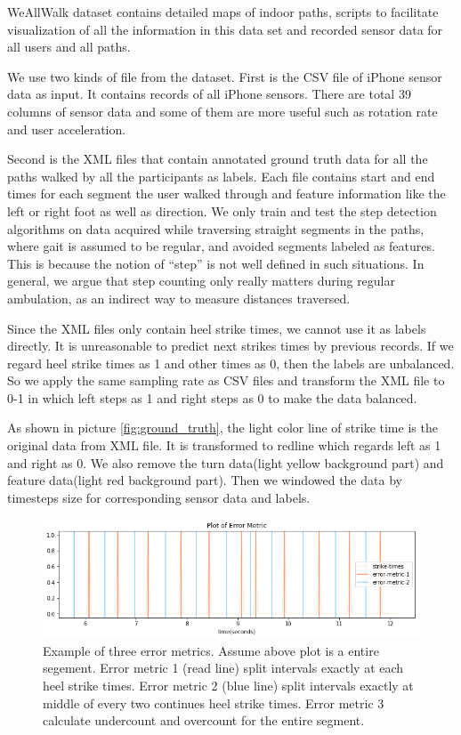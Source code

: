 \documentclass[11pt]{article}
\begin{document}
{WeAllWalk dataset contains detailed maps of indoor paths, scripts to facilitate visualization of all the information in this data set and recorded sensor data for all users and all paths.

We use two kinds of file from the dataset. First is the CSV file of iPhone sensor data as input. It contains records of all iPhone sensors. There are total 39 columns of sensor data and some of them are more useful such as rotation rate and user acceleration.

Second is the XML files that contain annotated ground truth data for all the paths walked by all the participants as labels. Each file contains start and end times for each segment the user walked through and feature information like the left or right foot as well as direction. We only train and test the step detection algorithms on data acquired while traversing straight segments in the paths, where gait is assumed to be regular, and avoided segments labeled as features. This is because the notion of “step” is not well defined in such situations. In general, we argue that step counting only really matters during regular ambulation, as an indirect way to measure distances traversed.

Since the XML files only contain heel strike times, we cannot use it as labels directly. It is unreasonable to predict next strikes times by previous records. If we regard heel strike times as 1 and other times as 0, then the labels are unbalanced. So we apply the same sampling rate as CSV files and transform the XML file to 0-1 in which left steps as 1 and right steps as 0 to make the data balanced.

As shown in picture \ref{fig:ground_truth}, the light color line of strike time is the original data from XML file. It is transformed to redline which regards left as 1 and right as 0. We also remove the turn data(light yellow background part) and feature data(light red background part). Then we windowed the data by timesteps size for corresponding sensor data and labels.

\begin{figure}[ht]
\centering
\includegraphics[scale=0.6]{error_metric}
\caption{Example of three error metrics. Assume above plot is a entire segement. Error metric 1 (read line) split intervals exactly at each heel strike times. Error metric 2 (blue line) split intervals exactly at middle of every two continues heel strike times. Error metric 3 calculate undercount and overcount for the entire segment.}
\label{fig:error_metric}
\end{figure}



}
\end{document}
